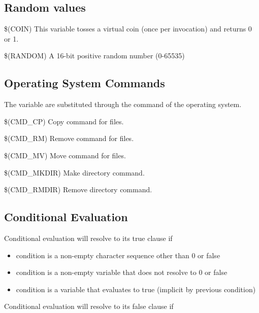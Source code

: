 \subsection{Random values}

\begin{codeentry}
\item[\$(COIN)] This variable tosses a virtual coin (once per invocation) and returns 0 or 1.
\item[\$(RANDOM)] A 16-bit positive random number (0-65535)
\end{codeentry}

\subsection{Operating System Commands}

The variable are substituted through the command of the operating system.

\begin{codeentry}
\item[\$(CMD\_CP)] Copy command for files.
\item[\$(CMD\_RM)] Remove command for files.
\item[\$(CMD\_MV)] Move command for files.
\item[\$(CMD\_MKDIR)] Make directory command.
\item[\$(CMD\_RMDIR)] Remove directory command.
\end{codeentry}

\subsection{Conditional Evaluation}


Conditional evaluation will resolve to its true clause if

\begin{itemize}
\item condition is a non-empty character sequence other than 0 or false
\item condition is a non-empty variable that does not resolve to 0 or false
\item condition is a variable that evaluates to true (implicit by previous condition)
\end{itemize}

Conditional evaluation will resolve to its false clause if

